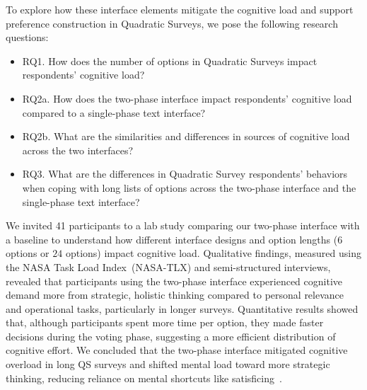 To explore how these interface elements mitigate the cognitive load and support preference construction in Quadratic Surveys, we pose the following research questions:
\begin{itemize}
    \item RQ1. How does the number of options in Quadratic Surveys impact respondents' cognitive load?
    \item RQ2a. How does the two-phase interface impact respondents' cognitive load compared to a single-phase text interface?
    \item RQ2b. What are the similarities and differences in sources of cognitive load across the two interfaces?
    \item RQ3. What are the differences in Quadratic Survey respondents' behaviors when coping with long lists of options across the two-phase interface and the single-phase text interface?
\end{itemize}

We invited 41 participants to a lab study comparing our two-phase interface with a baseline to understand how different interface designs and option lengths ($6$ options or $24$ options) impact cognitive load. Qualitative findings, measured using the NASA Task Load Index~(NASA-TLX) and semi-structured interviews, revealed that participants using the two-phase interface experienced cognitive demand more from strategic, holistic thinking compared to personal relevance and operational tasks, particularly in longer surveys. Quantitative results showed that, although participants spent more time per option, they made faster decisions during the voting phase, suggesting a more efficient distribution of cognitive effort. We concluded that the two-phase interface mitigated cognitive overload in long QS surveys and shifted mental load toward more strategic thinking, reducing reliance on mental shortcuts like satisficing~\cite{simonBehavioralModelRational1955}.


